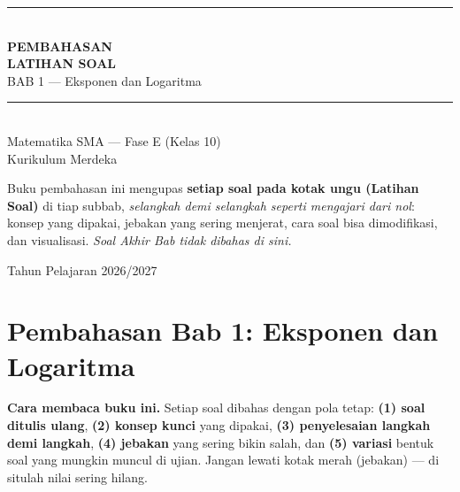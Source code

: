 \documentclass[11pt,a4paper]{report}
\theoremstyle{gaya}
\begin{document}
\setcounter{chapter}{1}

\begin{titlepage}
\centering
\vspace*{2cm}
{\color{ungu}\rule{\textwidth}{2pt}}\\[0.6cm]
{\Huge\bfseries\color{ungu} PEMBAHASAN\\[0.3cm] LATIHAN SOAL}\\[0.4cm]
{\Large BAB 1 — Eksponen dan Logaritma}\\[0.2cm]
{\color{ungu}\rule{\textwidth}{2pt}}\\[1.2cm]

{\large Matematika SMA — Fase E (Kelas 10)}\\[0.2cm]
{\large Kurikulum Merdeka}\\[2cm]

\begin{tcolorbox}[enhanced,width=0.85\textwidth,colback=ungumuda,colframe=ungu,
  arc=4pt,boxrule=1pt]
\centering\small
Buku pembahasan ini mengupas \textbf{setiap soal pada kotak ungu (Latihan Soal)}
di tiap subbab, \emph{selangkah demi selangkah seperti mengajari dari nol}:
konsep yang dipakai, jebakan yang sering menjerat, cara soal bisa dimodifikasi,
dan visualisasi. \emph{Soal Akhir Bab tidak dibahas di sini.}
\end{tcolorbox}

\vfill
{\large Tahun Pelajaran 2026/2027}
\end{titlepage}

\tableofcontents
\thispagestyle{empty}
\clearpage

\chapter*{Pembahasan Bab 1: Eksponen dan Logaritma}

\begin{tips}
\textbf{Cara membaca buku ini.} Setiap soal dibahas dengan pola tetap:
\textbf{(1) soal ditulis ulang}, \textbf{(2) konsep kunci} yang dipakai,
\textbf{(3) penyelesaian langkah demi langkah}, \textbf{(4) jebakan} yang
sering bikin salah, dan \textbf{(5) variasi} bentuk soal yang mungkin muncul di
ujian. Jangan lewati kotak merah (jebakan) --- di situlah nilai sering hilang.
\end{tips}
\end{document}
